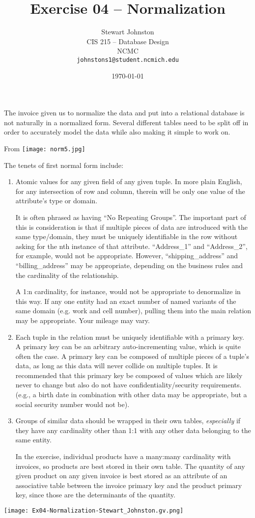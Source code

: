 \documentclass{article}
\title{Exercise 04 -- Normalization}
\author{Stewart Johnston\\
  {CIS 215 -- Database Design}\\
  {NCMC}\\
  {\texttt{johnstons1@student.ncmich.edu}}
}
\date{\today}
\begin{document}
\maketitle

The invoice given us to normalize the data and put into a relational
database is not naturally in a normalized form. Several different tables
need to be split off in order to accurately model the data while also
making it simple to work on.

From \texttt{[image: norm5.jpg]}

The tenets of first normal form include:
\begin{enumerate}
	\item Atomic values for any given field of any given tuple. In
		more plain English, for any intersection of row and
		column, therein will be only one value of the
		attribute's type or domain.
		
		It is often phrased as having ``No Repeating Groups''.
		The important part of this is consideration is that if
		multiple pieces of data are introduced with the same
		type/domain, they must be uniquely identifiable in
		the row without asking for the nth instance of that
		attribute.  ``Address_1'' and ``Address_2'', for
		example, would not be appropriate.  However,
		``shipping_address'' and ``billing_address'' may be
		appropriate, depending on the business rules and the
		cardinality of the relationship.
		
		A 1:n cardinality, for instance, would not be
		appropriate to denormalize in this way. If any one
		entity had an exact number of named variants of the same
		domain (e.g. work and cell number), pulling them into
		the main relation may be appropriate. Your mileage may
		vary.

	\item Each tuple in the relation must be uniquely identifiable
		with a primary key. A primary key can be an arbitrary
		auto-incrementing value, which is quite often the case.
		A primary key can be composed of multiple pieces of a
		tuple's data, as long as this data will never collide on
		multiple tuples. It is recommended that this primary key
		be composed of values which are likely never to change
		but also do not have confidentiality/security
		requirements. (e.g., a birth date in combination with
		other data may be appropriate, but a social security
		number would not be).

	\item Groups of similar data should be wrapped in their own
		tables, \emph{especially} if they have any cardinality
		other than 1:1 with any other data belonging to the same
		entity.

		In the exercise, individual products have a many:many
		cardinality with invoices, so products are best stored
		in their own table. The quantity of any given product on
		any given invoice is best stored as an attribute of an
		associative table between the invoice primary key and
		the product primary key, since those are the
		determinants of the quantity.

\end{enumerate}

\texttt{[image: Ex04-Normalization-Stewart\_Johnston.gv.png]}
\end{document}
